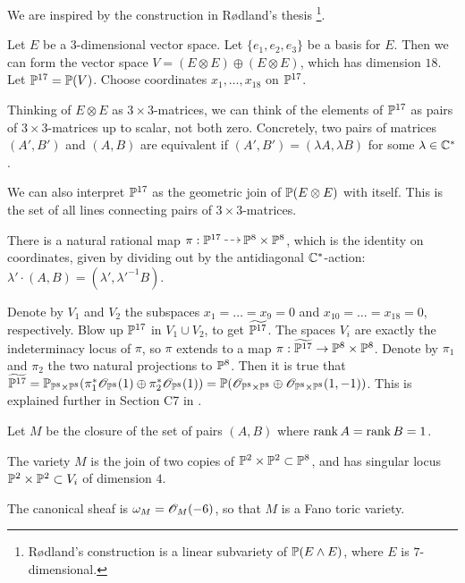 We are inspired by the construction in Rødland's thesis \cite{rodland_pfaffian}\footnote{Rødland's construction is a linear subvariety of $\P(E \wedge E)$, where $E$ is $7$-dimensional.}.

Let $E$ be a 3-dimensional vector space. Let $\{e_1,e_2,e_3\}$ be a basis for $E$. Then we can form the vector space $V=(E \otimes E) \oplus (E \otimes E)$, which has dimension $18$. Let $\P^{17}=\P(V)$. Choose coordinates $x_1,\ldots,x_{18}$ on $\P^{17}$. 

Thinking of $E \otimes E$ as $3 \times 3$-matrices, we can think of the elements of $\P^{17}$ as pairs of $3 \times 3$-matrices up to scalar, not both zero. Concretely, two pairs of matrices $(A',B')$ and $(A,B)$ are equivalent if $(A',B') = (\lambda A, \lambda B)$ for some $\lambda \in \C^\ast$.

We can also interpret $\P^{17}$ as the geometric join of $\P(E \otimes E)$ with itself. This is the set of all lines connecting pairs of $3 \times 3$-matrices.

There is a natural rational map $\pi:\P^{17} \rmap \P^8 \times \P^8$, which is the identity on coordinates, given by dividing out by the antidiagonal $\C^\ast$-action: $\lambda' \cdot (A,B) = (\lambda',{\lambda'}^{-1} B)$.

Denote by $V_1$ and $V_2$ the subspaces $x_1=\ldots=x_9=0$ and $x_{10}=\ldots=x_{18}=0$, respectively. Blow up $\P^{17}$ in $V_1 \cup V_2$, to get $\widetilde{\P^{17}}$. The spaces $V_i$ are exactly the indeterminacy locus of $\pi$, so $\pi$ extends to a map $\pi:\widetilde{\P^{17}} \to \P^8 \times \P^8$. Denote by $\pi_1$ and $\pi_2$ the two natural projections to $\P^8$. Then it is true that $\widetilde{\P^{17}}= \P_{\P^8 \times \P^8}(\pi_1^\ast \OO_{\P^8}(1) \oplus \pi_2^\ast \OO_{\P^8}(1))=\P(\OO_{\P^8\times \P^8} \oplus \OO_{\P^8 \times \P^8}(1,-1))$. This is explained further in Section C7 in \cite{altman_joins}.

Let $M$ be the closure of the set of pairs $(A,B)$ where $\rank A = \rank B = 1$.  

\begin{proposition}
\label{prop:m}
The variety $M$ is the join of two copies of $\P^2 \times \P^2 \subset \P^8$, and has singular locus $\P^2 \times \P^2 \subset V_i$ of dimension $4$.

The canonical sheaf is $\omega_M = \OO_M(-6)$, so that $M$ is a Fano toric variety.
\end{proposition}

